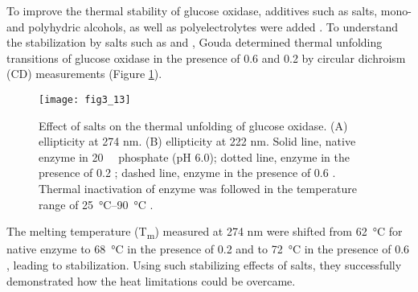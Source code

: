 \begin{refsection}
To improve the thermal stability of glucose oxidase, additives such as salts,
mono- and polyhydric alcohols, as well as polyelectrolytes were added
\cite{Appleton1997,Gouda2003}. To understand the stabilization by salts
such as  and , Gouda  determined thermal
unfolding transitions of glucose oxidase in the presence of \SI{0.6}{\Molar}
 and \SI{0.2}{\Molar}  by circular dichroism (CD)
measurements \cite{Gouda2003} (Figure \ref{fig:heat-inactivation-improve}). 
\begin{figure}[htbp] \centering \texttt{[image: fig3\_13]} 
    \caption[Effect of salts on the thermal unfolding of  glucose oxidase. (A)
    ellipticity at 274 nm. (B) ellipticity at 222 nm. Solid line, native enzyme
in \SI{20}{\milli\Molar} phosphate (pH 6.0); dotted line, enzyme in the
presence of \SI{0.2}{\Molar}  ; dashed line, enzyme in the presence
of \SI{0.6}{\Molar} . Thermal inactivation of enzyme was followed in
the temperature range of \SIrange{25}{90}{\celsius}.]{Effect of salts on the thermal
    unfolding of  glucose oxidase. (A) ellipticity at 274 nm. (B) ellipticity
    at 222 nm. Solid line, native enzyme in \SI{20}{\milli\Molar} phosphate (pH
    6.0); dotted line, enzyme in the presence of \SI{0.2}{\Molar}  ;
    dashed line, enzyme in the presence of \SI{0.6}{\Molar} . Thermal
    inactivation of enzyme was followed in the temperature range of
    \SIrange{25}{90}{\celsius} \cite{Gouda2003}.}
    \label{fig:heat-inactivation-improve} 
\end{figure}

The melting temperature (T\textsubscript{m}) measured at 274 nm were shifted
from \SI{62}{\celsius} for native enzyme to \SI{68}{\celsius} in the presence
of \SI{0.2}{\Molar}  and to \SI{72}{\celsius} in the presence of
\SI{0.6}{\Molar} , leading to stabilization. Using such stabilizing
effects of salts, they successfully demonstrated how the heat limitations could
be overcame. 


\end{refsection}
